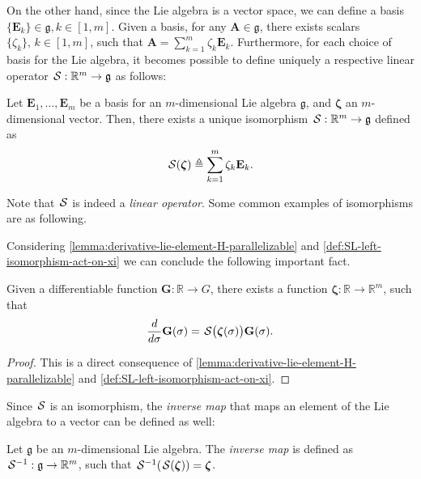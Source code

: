  On the other hand, since the Lie algebra is a vector space, we can define a basis $\{\mathbf{E}_k\}\in\mathfrak{g}, k\in[1,m]$. Given a basis, for any $\mathbf{A} \in\mathfrak{g}$, there exists scalars $\{\zeta_k\},\, k\in[1,m]$, such that $\mathbf{A} = \sum_{k=1}^{m} \zeta_k\mathbf{E}_k$. Furthermore, for each choice of basis for the Lie algebra, it becomes possible to define uniquely a respective linear operator $\SL:\mathbb{R}^{m}\to\mathfrak{g}$ as follows:
\begin{definition}[S map]\label{def:SL-left-isomorphism-act-on-xi}
    Let $\mathbf{E}_1,\dots,\mathbf{E}_m$ be a basis for an $m$-dimensional Lie algebra $\mathfrak{g}$, and $\boldsymbol{\zeta}$ an $m$-dimensional vector. Then, there exists a unique isomorphism $\SL:\mathbb{R}^{m}\to\mathfrak{g}$ defined as
    \begin{equation}
        \SL[\boldsymbol{\zeta}] \triangleq \sum_{k=1}^m\zeta_k\mathbf{E}_k.    
    \end{equation}
    
\end{definition}
Note that $\SL$ is indeed a \emph{linear operator}. Some common examples of isomorphisms are as following.


Considering \autoref{lemma:derivative-lie-element-H-parallelizable} and \autoref{def:SL-left-isomorphism-act-on-xi} we can conclude the following important fact.

\begin{lemma} \label{lemma:very-important-fact}
    Given a differentiable function $\mathbf{\mathbf{G}}:\mathbb{R}\to G$, there exists a function $\boldsymbol{\zeta}:\mathbb{R}\to\mathbb{R}^m$, such that
    \begin{align}
    \label{eq:importantresult}
    \frac{d}{d\sigma} \mathbf{\mathbf{G}}(\sigma)=\SL\bigl(\boldsymbol{\zeta}(\sigma)\bigr)\mathbf{\mathbf{G}}(\sigma). 
\end{align}

\end{lemma}
\begin{proof} This is a direct consequence of \cref{lemma:derivative-lie-element-H-parallelizable} and \cref{def:SL-left-isomorphism-act-on-xi}. 
\end{proof}

Since $\SL$ is an isomorphism, the \emph{inverse map} that maps an element of the Lie algebra to a vector can be defined as well:
\begin{definition}\label{def:inverse-isomorphism-SLinv}
    Let $\mathfrak{g}$ be an $m$-dimensional Lie algebra. The \emph{inverse map} is defined as $\invSL:\mathfrak{g}\to\mathbb{R}^m$, such that $\invSL[\SL[\boldsymbol{\zeta}]] = \boldsymbol{\zeta}$. 
\end{definition}

